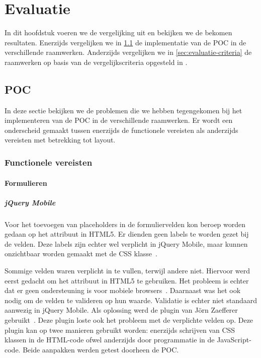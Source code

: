 \chapter{Evaluatie}
\label{chap:evaluatie}

In dit hoofdstuk voeren we de vergelijking uit en bekijken we de bekomen resultaten.
Enerzijds vergelijken we in \ref{sec:evaluatie-poc} de implementatie van de POC in de verschillende raamwerken.
Anderzijds vergelijken we in \ref{sec:evaluatie-criteria} de raamwerken op basis van de vergelijkscriteria opgesteld in .


\section{POC}
\label{sec:evaluatie-poc}
In deze sectie bekijken we de problemen die we hebben tegengekomen bij het implementeren van de POC in de verschillende raamwerken.
Er wordt een onderscheid gemaakt tussen enerzijds de functionele vereisten als anderzijds vereisten met betrekking tot layout.

\subsection{Functionele vereisten}

\subsubsection{Formulieren}

\paragraph{jQuery Mobile} 
Voor het toevoegen van placeholders in de formuliervelden kon beroep worden gedaan op het  attribuut in HTML5. Er dienden geen labels te worden gezet bij de velden. Deze labels zijn echter wel verplicht in jQuery Mobile, maar kunnen onzichtbaar worden gemaakt met de  CSS klasse~\cite{JQuery2013}.

Sommige velden waren verplicht in te vullen, terwijl andere niet. Hiervoor werd eerst gedacht om het  attribuut in HTML5 te gebruiken. Het probleem is echter dat er geen ondersteuning is voor mobiele browsers~\cite{Deveria2013}. Daarnaast was het ook nodig om de velden te valideren op hun waarde. Validatie is echter niet standaard aanwezig in jQuery Mobile. Als oplossing werd de plugin van Jörn Zaefferer gebruikt~\cite{Zaefferer2013}. Deze plugin loste ook het probleem met de verplichte velden op. Deze plugin kan op twee manieren gebruikt worden: enerzijds schrijven van CSS klassen in de HTML-code ofwel anderzijds door programmatie in de JavaScript-code. Beide aanpakken werden getest doorheen de POC. 

